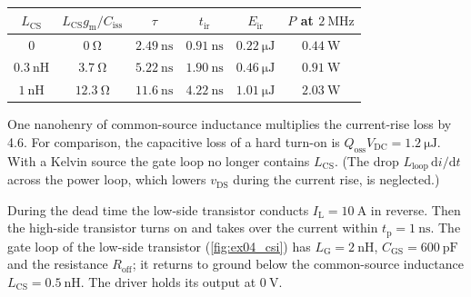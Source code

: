 \begin{solutionblock}
	\begin{solutiontable}[ht]
		\centering
		\begin{tabular}{|c|c|c|c|c|c|}
			\hline
			$L_\mathrm{CS}$ & $L_\mathrm{CS}g_\mathrm{m}/C_\mathrm{iss}$ & $\tau$ & $t_\mathrm{ir}$ & $E_\mathrm{ir}$ & $P$ at $\SI{2}{\mega\hertz}$ \\
			\hline
			$0$                     & $\SI{0}{\ohm}$    & $\SI{2.49}{\nano\second}$ & $\SI{0.91}{\nano\second}$ & $\SI{0.22}{\micro\joule}$ & $\SI{0.44}{\watt}$ \\
			$\SI{0.3}{\nano\henry}$ & $\SI{3.7}{\ohm}$  & $\SI{5.22}{\nano\second}$ & $\SI{1.90}{\nano\second}$ & $\SI{0.46}{\micro\joule}$ & $\SI{0.91}{\watt}$ \\
			$\SI{1}{\nano\henry}$   & $\SI{12.3}{\ohm}$ & $\SI{11.6}{\nano\second}$ & $\SI{4.22}{\nano\second}$ & $\SI{1.01}{\micro\joule}$ & $\SI{2.03}{\watt}$ \\
			\hline
		\end{tabular}
		\caption{Current rise with common-source inductance}
	\end{solutiontable}
	One nanohenry of common-source inductance multiplies the current-rise loss by 4.6. For comparison, the capacitive loss of a hard turn-on is $Q_\mathrm{oss}V_\mathrm{DC}=\SI{1.2}{\micro\joule}$. With a Kelvin source the gate loop no longer contains $L_\mathrm{CS}$. (The drop $L_\mathrm{loop}\,\mathrm{d}i/\mathrm{d}t$ across the power loop, which lowers $v_\mathrm{DS}$ during the current rise, is neglected.)
\end{solutionblock}



During the dead time the low-side transistor conducts $I_\mathrm{L}=\SI{10}{\ampere}$ in reverse. Then the high-side transistor turns on and takes over the current within $t_\mathrm{p}=\SI{1}{\nano\second}$. The gate loop of the low-side transistor (\autoref{fig:ex04_csi}) has $L_\mathrm{G}=\SI{2}{\nano\henry}$, $C_\mathrm{GS}=\SI{600}{\pico\farad}$ and the resistance $R_\mathrm{off}$; it returns to ground below the common-source inductance $L_\mathrm{CS}=\SI{0.5}{\nano\henry}$. The driver holds its output at $\SI{0}{\volt}$.




